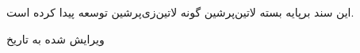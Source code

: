 \pagebreak
\thispagestyle{version}
\vspace*{\fill}
\begin{center}
این سند برپایه بسته ‌لاتین{‌پرشین} گونه ‌لاتین{‌زی‌پرشین} توسعه پیدا کرده است.

ویرایش شده به تاریخ 
\end{center}
\pagebreak
